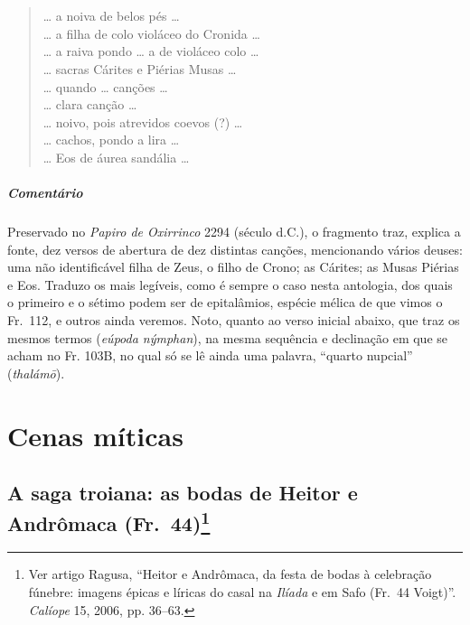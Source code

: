 {\chapter*{}
\section*{}
\begin{verse}
\ldots{} a noiva de belos pés \ldots{}\\[8pt]
\ldots{} a filha de colo violáceo do Cronida \ldots{}\\[8pt]
\ldots{} a raiva pondo \ldots{} a de violáceo colo \ldots{}\\[8pt]
\ldots{} sacras Cárites e Piérias Musas \ldots{}\\[8pt]
\ldots{} quando \ldots{} canções \ldots{}\\[8pt]
\ldots{} clara canção \ldots{}\\[8pt]
\ldots{} noivo, pois atrevidos coevos (?) \ldots{}\\[8pt]
\ldots{} cachos, pondo a lira \ldots{}\\[8pt]
\ldots{} Eos de áurea sandália \ldots{}\\[8pt]
\end{verse}

{\paragraph{Comentário} Preservado  no \textit{Papiro de Oxirrinco} 2294 (século  d.C.), o fragmento traz, explica a fonte, dez versos de abertura de dez distintas canções, mencionando vários deuses: uma não identificável filha de Zeus, o filho de Crono; as Cárites; as Musas Piérias e Eos. Traduzo os mais legíveis, como é sempre o caso nesta antologia, dos quais o primeiro e o sétimo podem ser de epitalâmios, espécie mélica de que vimos o Fr.~112, e outros ainda veremos.
Noto, quanto ao verso inicial abaixo, que traz os mesmos termos (\textit{eúpoda nýmphan}), na mesma sequência e declinação em que se acham no Fr. 103B, no qual só se lê ainda uma palavra, ``quarto nupcial'' (\textit{thalámō}).}


\chapter{Cenas míticas}

\section[A saga troiana: as bodas de Heitor e Andrômaca (Fr.~44)]{A saga troiana: as bodas de Heitor e\\ Andrômaca (Fr.~44)\protect\footnote{\MakeUppercase{V}er
artigo \MakeUppercase{R}agusa, “\MakeUppercase{H}eitor e \MakeUppercase{A}ndrômaca, da festa de bodas à celebração fúnebre:
imagens épicas e líricas do casal na \textit{\MakeUppercase{I}líada} e em \MakeUppercase{S}afo (\MakeUppercase{F}r.~44 Voigt)”.
\textit{\MakeUppercase{C}alíope} 15, 2006, pp. 36--63.}}

}
